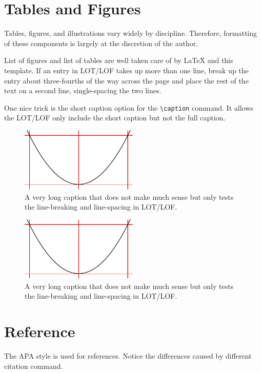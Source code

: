 \section{Tables and Figures}
Tables, figures, and illustrations vary widely by discipline. Therefore, formatting of these
components is largely at the discretion of the author.

List of figures and list of tables are well taken care of by \LaTeX{} and this
template.  If an entry in LOT/LOF takes up more than one line, break up the
entry about three-fourths of the way across the page and place the rest of the
text on a second line, single-spacing the two lines.

One nice trick is the short caption option for the
\texttt{\textbackslash{}caption{}} command.  It allows the LOT/LOF only include
the short caption but not the full caption.
\begin{figure}
    \centering
    \includegraphics[width=0.5\textwidth]{figures/demo.pdf}
    \caption{A very long caption that does not make much sense but only tests the line-breaking and line-spacing in LOT/LOF.}
\end{figure}

\begin{figure}
    \centering
    \includegraphics[width=0.5\textwidth]{figures/demo.pdf}
    \caption[Short Caption]{A very long caption that does not make much sense but only tests the line-breaking and line-spacing in LOT/LOF.}
\end{figure}

\section{Reference}
The APA style is used for references. Notice the differences caused by different citation command.

